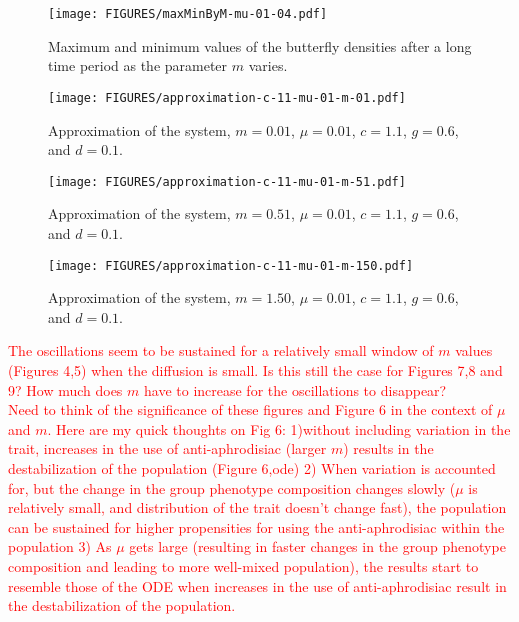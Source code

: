 \documentclass[review]{elsarticle}
\begin{document}
\begin{figure}[htb]
  \centering
  \texttt{[image: FIGURES/maxMinByM-mu-01-04.pdf]}
  \caption[Maximum and minimum values of the butterfly
  density]{Maximum and minimum values of the butterfly densities after
    a long time period as the parameter $m$ varies.}
  \label{fig:maxMinButterflySmallMu}
\end{figure}

\begin{figure}[htb]
  \centering
  \texttt{[image: FIGURES/approximation-c-11-mu-01-m-01.pdf]}
  \caption[Approximation with $c=1.1$, $m=0.01$ and $\mu=0.01$.]{Approximation of
    the system, $m=0.01$, $\mu=0.01$, $c=1.1$, $g=0.6$, and $d=0.1$. }
  \label{fig:approximationM01Mu01C11}
\end{figure}

\begin{figure}[htb]
  \centering
  \texttt{[image: FIGURES/approximation-c-11-mu-01-m-51.pdf]}
  \caption[Approximation with $c=1.1$, $m=0.51$ and $\mu=0.01$.]{Approximation of
    the system, $m=0.51$, $\mu=0.01$, $c=1.1$, $g=0.6$, and $d=0.1$. }
  \label{fig:approximationM51Mu01C11}
\end{figure}


\begin{figure}[htb]
  \centering
  \texttt{[image: FIGURES/approximation-c-11-mu-01-m-150.pdf]}
  \caption[Approximation with $c=1.1$, $m=1.50$ and $\mu=0.01$.]{Approximation of
    the system, $m=1.50$, $\mu=0.01$, $c=1.1$, $g=0.6$, and $d=0.1$. }
  \label{fig:approximationM150Mu01C11}
\end{figure}
\textcolor{red}{The oscillations seem to be sustained for a relatively small window of $m$ values (Figures 4,5) when the diffusion is small. Is this still the case for Figures 7,8 and 9? How much does $m$ have to increase for the oscillations to disappear? 
\\Need to think of the significance of these figures and Figure 6 in the context of $\mu$ and $m$. Here are my quick thoughts on Fig 6: 1)without including variation in the trait, increases in the use of anti-aphrodisiac (larger $m$) results in the destabilization of the population (Figure 6,ode) 2) When variation is accounted for, but the change in the group phenotype composition changes slowly ($\mu$ is relatively small, and distribution of the trait doesn't change fast), the population can be sustained for higher propensities for using the anti-aphrodisiac within the population 3) As $\mu$ gets large (resulting in faster changes in the group phenotype composition and leading to more well-mixed population), the results start to resemble those of the ODE when increases in the use of anti-aphrodisiac result in the destabilization of the population.  }
\end{document}
